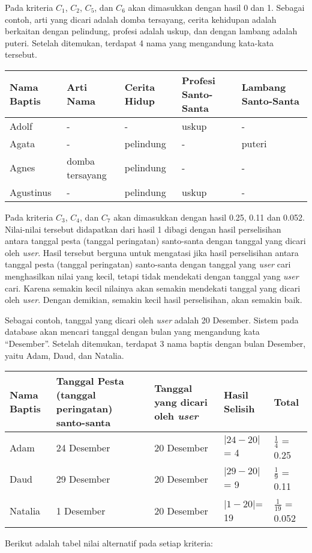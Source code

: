 \documentclass[a4paper,twoside]{article}
\begin{document}
\begin{enumerate}
Pada kriteria $C_{1}$, $C_{2}$, $C_{5}$, dan $C_{6}$ akan dimasukkan dengan hasil 0 dan 1. Sebagai contoh, arti yang dicari adalah domba tersayang, cerita kehidupan adalah berkaitan dengan pelindung, profesi adalah uskup, dan dengan lambang adalah puteri. Setelah ditemukan, terdapat 4 nama yang mengandung kata-kata tersebut.

\begin{center}
    \begin{tabular}{| l | l | l| l | l | } %
    \hline
    Nama Baptis & Arti Nama & Cerita Hidup & Profesi Santo-Santa & Lambang Santo-Santa \\ \hline
  Adolf & - & - & uskup & - \\ \hline 
	Agata & - & pelindung & - & puteri \\ \hline
	Agnes & domba tersayang & pelindung & - & - \\ \hline
	Agustinus & - & pelindung & uskup & - \\ 

	     \hline
    \end{tabular}
\end{center}

 

Pada kriteria $C_{3}$, $C_{4}$, dan $C_{7}$ akan dimasukkan dengan hasil 0.25, 0.11 dan 0.052. Nilai-nilai tersebut didapatkan dari hasil 1 dibagi dengan hasil perselisihan antara tanggal pesta (tanggal peringatan) santo-santa dengan tanggal yang dicari oleh \textit{user}. Hasil tersebut berguna untuk mengatasi jika hasil perselisihan antara tanggal pesta (tanggal peringatan) santo-santa dengan tanggal yang \textit{user} cari menghasilkan nilai yang kecil, tetapi tidak mendekati dengan tanggal yang \textit{user} cari. Karena semakin kecil nilainya akan semakin mendekati tanggal yang dicari oleh \textit{user}. Dengan demikian, semakin kecil hasil perselisihan, akan semakin baik. 

Sebagai contoh, tanggal yang dicari oleh \textit{user} adalah 20 Desember. Sistem pada database akan mencari tanggal dengan bulan yang mengandung kata ``Desember''. Setelah ditemukan, terdapat 3 nama baptis dengan bulan Desember, yaitu Adam, Daud, dan Natalia.

\begin{center}
    \begin{tabular}{| l | p{3cm} | p{3cm}| l | l | }
    \hline
    Nama Baptis & Tanggal Pesta (tanggal peringatan) santo-santa & Tanggal yang dicari oleh \textit{user} & Hasil Selisih &  Total\\ \hline
  Adam & 24 Desember & 20 Desember & $|24 - 20 | $= 4 & $\frac{1}{4}$ = 0.25\\ \hline 
	Daud & 29 Desember & 20 Desember & $|29 - 20 |$ = 9 & $\frac{1}{9}$ = 0.11\\ \hline
	Natalia & 1 Desember & 20 Desember & $|1 - 20 | $= 19 & $\frac{1}{19}$ = 0.052\\ 
	     \hline
    \end{tabular}
\end{center}
Berikut adalah tabel nilai alternatif pada setiap kriteria:
\begin{center}


\end{center}
\end{enumerate}
\end{document}

